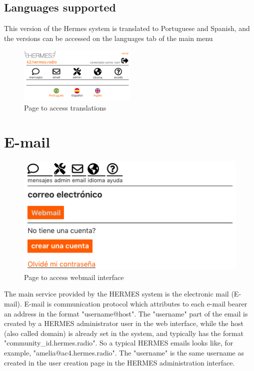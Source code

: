 \documentclass[11pt,a4paper]{article}
\begin{document}
\subsection{Languages supported}
\label{langs}

This version of the Hermes system is translated to Portuguese and Spanish, and the versions can be accessed on the languages tab of the main menu

\begin{figure}[H]
    \centering
    \includegraphics[width=0.5\textwidth]{screenshots/frontend/es/languages.png}
    \caption{Page to access translations}
	\vspace{-10pt}
    \label{fig:languages}
\end{figure}


\section{E-mail}
\label{email}

\begin{figure}[H]
  \centering
  \includegraphics[width=0.5\columnwidth]{screenshots/frontend/es_old/webmail.png}
  \caption{Page to access webmail interface}
  \vspace{-10pt}
  \label{fig:webmail2}
\end{figure}

The main service provided by the HERMES system is the electronic mail (E-mail). E-mail is communication protocol which attributes to each e-mail bearer an address in the format "username@host". The "username" part of the email is created by a HERMES administrator user in the web interface, while the host (also called domain) is already set in the system, and typically has the format "community\_id.hermes.radio". So a typical HERMES emails looks like, for example, "amelia@ac4.hermes.radio". The "username" is the same username as created in the user creation page in the HERMES administration interface.
\end{document}
